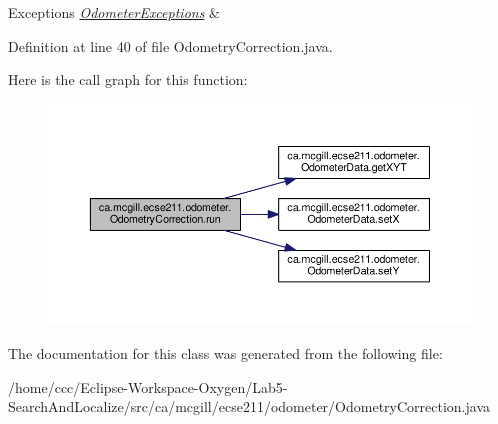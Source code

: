 \begin{DoxyExceptions}{Exceptions}
{\em \hyperlink{classca_1_1mcgill_1_1ecse211_1_1odometer_1_1_odometer_exceptions}{Odometer\+Exceptions}} & \\
\hline
\end{DoxyExceptions}


Definition at line 40 of file Odometry\+Correction.\+java.

Here is the call graph for this function\+:
\nopagebreak
\begin{figure}[H]
\begin{center}
\leavevmode
\includegraphics[width=350pt]{classca_1_1mcgill_1_1ecse211_1_1odometer_1_1_odometry_correction_aad66a7030ac00f3a9cbe7bc33c25acbf_cgraph}
\end{center}
\end{figure}


The documentation for this class was generated from the following file\+:\begin{DoxyCompactItemize}
\item 
/home/ccc/\+Eclipse-\/\+Workspace-\/\+Oxygen/\+Lab5-\/\+Search\+And\+Localize/src/ca/mcgill/ecse211/odometer/Odometry\+Correction.\+java\end{DoxyCompactItemize}

